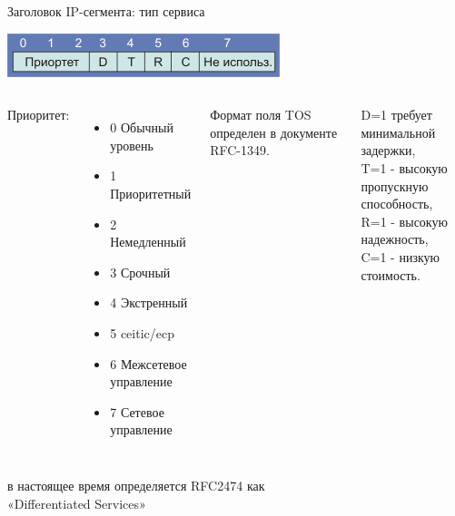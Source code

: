 \begin{frame}{Заголовок IP-сегмента: тип сервиса}
	\begin{center}
		\includegraphics[height=0.1\textheight]{03-tos.png}
	\end{center}
	\begin{columns}
		Приоритет:
		\begin{itemize}
			\item 0 Обычный уровень
			\item 1 Приоритетный
			\item 2 Немедленный
			\item 3 Срочный
			\item 4 Экстренный
			\item 5 ceitic/ecp
			\item 6 Межсетевое управление
			\item 7 Сетевое управление
		\end{itemize}
		Формат поля TOS определен в документе RFC-1349.
		
		D=1 требует минимальной задержки,\\		
		T=1 - высокую пропускную способность,\\
		R=1 - высокую надежность,\\
		C=1 - низкую стоимость.
	\end{columns}
	\begin{center}в настоящее время определяется RFC2474 как\\«Differentiated Services»\end{center}
\end{frame}

